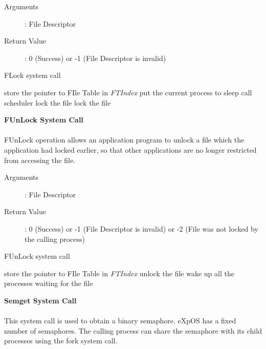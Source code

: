 \documentclass[10pt]{article}
\begin{document}
\begin{description}
\item[Arguments]: File Descriptor
\item[Return Value]: 0 (Success) or -1 (File Descriptor is invalid)
\end{description} 
\begin{algorithm}
\caption{FLock system call}
\begin{algorithmic}
\ENDIF
{}
\ELSE 
    \STATE store the pointer to FIle Table in  \textit{FTIndex}
\ENDIF
{}
            \STATE put the current process to sleep
            \STATE call scheduler
        \ENDWHILE
        \STATE lock the file
    \ENDIF
\ELSE
    \STATE lock the file
\ENDIF
{}
\end{algorithmic}
\end{algorithm}
\textbf{FUnLock System Call}
\\ \\
FUnLock operation allows an application program to unlock a file which the application had locked earlier, so that other applications are no longer restricted from accessing the file.   
\begin{description}
\item[Arguments]: File Descriptor
\item[Return Value]: 0 (Success) or -1 (File Descriptor is invalid) or -2 (File was not locked by the calling process)
\end{description} 
\begin{algorithm}
\caption{FUnLock system call}
\begin{algorithmic}
\ENDIF
{}
\ELSE 
    \STATE store the pointer to FIle Table in  \textit{FTIndex}
\ENDIF
{}
        \STATE unlock the file
        \STATE wake up all the processes waiting for the file
    \ELSE
    \ENDIF
\ENDIF
{}
\end{algorithmic}
\end{algorithm}
\vspace{22mm}
\textbf{Semget System Call}
\\ \\
This system call is used to obtain a binary semaphore. eXpOS has a fixed number of semaphores. The calling process can share the semaphore with its child processes using the fork system call. 
\end{document}
